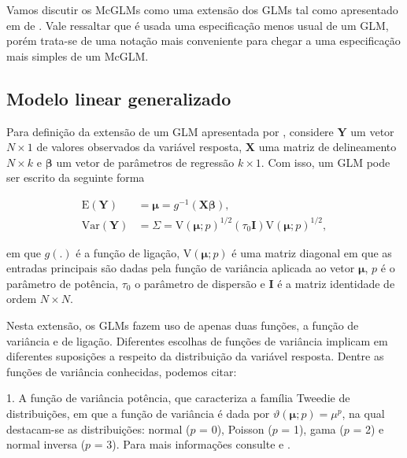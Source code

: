 Vamos discutir os McGLMs como uma extensão dos GLMs tal como apresentado em de \citet{Bonat16}. Vale ressaltar que é usada uma especificação menos usual de um GLM, porém trata-se de uma notação mais conveniente para chegar a uma especificação mais simples de um McGLM.

\subsection{Modelo linear generalizado}

Para definição da extensão de um GLM apresentada por \citet{Bonat16}, considere $\boldsymbol{Y}$ um vetor $N \times 1$ de valores observados da variável resposta, $\boldsymbol{X}$ uma matriz de delineamento $N \times k$ e $\boldsymbol{\beta}$ um vetor de parâmetros de regressão $k \times 1$. Com isso, um GLM pode ser escrito da seguinte forma 

\begin{equation}
\label{eq:glm}
      \begin{aligned}
        \mathrm{E}(\boldsymbol{Y}) &=
         \boldsymbol{\mu} =
            g^{-1}(\boldsymbol{X} \boldsymbol{\beta}),
            \\
        \mathrm{Var}(\boldsymbol{Y}) &=
          \Sigma =
          \mathrm{V}\left(\boldsymbol{\mu}; p\right)^{1/2}\left(\tau_0\boldsymbol{I}\right)\mathrm{V}\left(\boldsymbol{\mu}; p\right)^{1/2},
      \end{aligned}
\end{equation}

\noindent em que $g(.)$ é a função de ligação, $\mathrm{V}\left(\boldsymbol{\mu}; p\right)$ é uma matriz diagonal em que as entradas principais são dadas pela função de variância aplicada ao vetor $\boldsymbol{\mu}$, $p$ é o parâmetro de potência, $\tau_0$ o parâmetro de dispersão e $\boldsymbol{I}$ é a matriz identidade de ordem $N\times N$.

Nesta extensão, os GLMs fazem uso de apenas duas funções, a função de variância e de ligação. Diferentes escolhas de funções de variância implicam em diferentes suposições a respeito da distribuição da variável resposta. Dentre as funções de variância conhecidas, podemos citar:

1. A função de variância potência, que caracteriza a família Tweedie de distribuições, em que a função de variância é dada por $\vartheta\left(\boldsymbol{\mu}; p\right) = \mu^p$, na qual destacam-se as distribuições: normal ($p$ = 0), Poisson ($p$ = 1), gama ($p$ = 2) e  normal inversa ($p$ = 3). Para mais informações consulte \citet{Jorgensen87} e \citet{Jorgensen97}.

